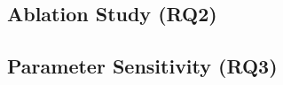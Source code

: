 
\subsection{Ablation Study (RQ2)}
\label{subsec:ablation}


\subsection{Parameter Sensitivity (RQ3)}
\label{subsec:sensitivity}

